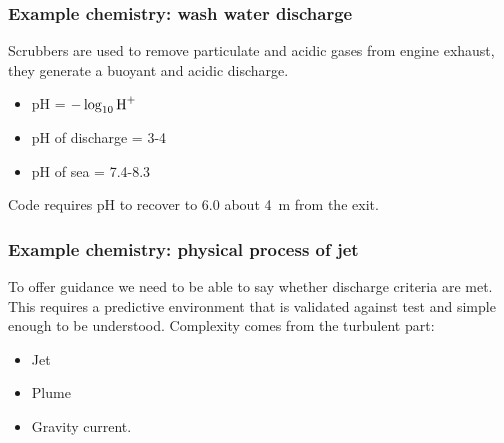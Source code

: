 \subsubsection{Example chemistry: wash water discharge}
Scrubbers are used to remove particulate and acidic gases from engine exhaust, they generate a buoyant and acidic discharge.
\begin{itemize}
    \item pH = $-\log_{10}\ce{H^+}$
    \item pH of discharge = 3-4
    \item pH of sea = 7.4-8.3
\end{itemize}
Code requires pH to recover to 6.0 about \SI{4}{\meter} from the exit.
\subsubsection{Example chemistry: physical process of jet}
To offer guidance we need to be able to say whether discharge criteria are met. This requires a predictive environment that is validated against test and simple enough to be understood. Complexity comes from the turbulent part:
\begin{itemize}
    \item Jet
    \item Plume
    \item Gravity current.
\end{itemize}
